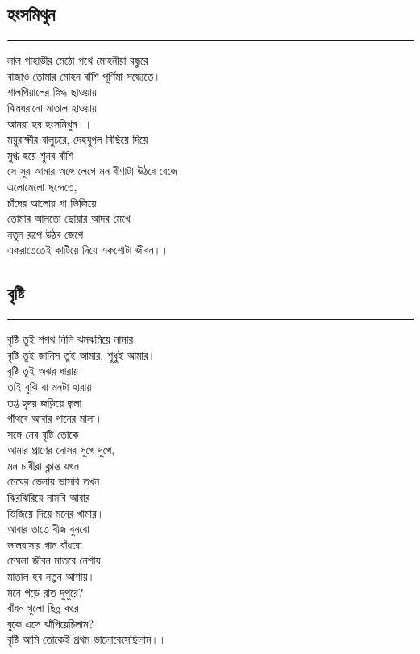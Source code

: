 \documentclass[12pt]{article}
\begin{document}
\subsection*{হংসমিথুন }
\hrule
\vspace{1in}
লাল পাহাড়ীর মেঠো পথে মোহনীয়া বন্ধুরে\\
বাজাও তোমার মোহন বাঁশি পূর্ণিমা সন্ধ্যেতে।\\
শালপিয়ালের স্নিগ্ধ ছাওয়ায়\\
ঝিমধরানো মাতাল হাওয়ায়\\
আমরা হব হংসমিথুন।।\\

\noindent
ময়ুরাক্ষীর বালুচরে, দেহযুগল বিছিয়ে দিয়ে\\
মুগ্ধ হয়ে শুনব বাঁশি।\\
সে সুর আমার অঙ্গে লেগে মন বীণাটা উঠবে বেজে\\
এলোমেলো ছন্দেতে,\\
চাঁদের আলোয় গা ভিজিয়ে\\
তোমার আলতো ছোয়ার আদর মেখে\\
নতুন রূপে উঠব জেগে\\
একরাতেতেই কাটিয়ে দিয়ে একশোটা জীবন।।\\
\newpage

\subsection*{বৃষ্টি }
\hrule
\vspace{1in}
বৃষ্টি তুই শপথ নিলি ঝমঝমিয়ে নামার\\
বৃষ্টি তুই জানিস তুই আমার, শুধুই আমার।\\
বৃষ্টি তুই অঝর ধারায়\\
তাই বুঝি বা মনটা হারায়\\
তপ্ত হৃদয় জড়িয়ে জ্বালা\\
গাঁথবে আবার গানের মালা।\\
সঙ্গে নেব বৃষ্টি তোকে\\
আমার প্রাণের দোসর সুখে দুখে,\\
মন চাষীরা ক্লান্ত যখন\\
মেঘের ভেলায় ভাসবি তখন\\
ঝিরঝিরিয়ে নামবি আবার\\
ভিজিয়ে দিয়ে মনের খামার।\\
আবার তাতে বীজ বুনবো\\
ভালবাসার গান বাঁধবো\\
মেঘলা জীবন মাতবে নেশায়\\
মাতাল হব নতুন আশায়।\\
মনে পড়ে রাত দুপুরে?\\
বাঁধন গুলো ছিন্ন করে\\
বুকে এসে ঝাঁপিয়েচিলাম?\\
বৃষ্টি আমি তোকেই প্রথম ভালোবেসেছিলাম।।\\
\newpage
\end{document}
